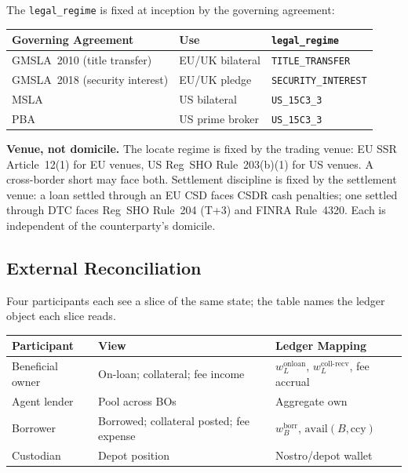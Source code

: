 The \texttt{legal\_regime} is fixed at inception by the governing agreement:

\begin{center}\small
\begin{tabular}{l l l}
\toprule
\textbf{Governing Agreement} & \textbf{Use} & \textbf{\texttt{legal\_regime}} \\
\midrule
GMSLA~2010 (title transfer) & EU/UK bilateral & \texttt{TITLE\_TRANSFER} \\
GMSLA~2018 (security interest) & EU/UK pledge & \texttt{SECURITY\_INTEREST} \\
MSLA & US bilateral & \texttt{US\_15C3\_3} \\
PBA & US prime broker & \texttt{US\_15C3\_3} \\
\bottomrule
\end{tabular}
\end{center}

\noindent\textbf{Venue, not domicile.} The locate regime is fixed by the trading venue: EU SSR Article~12(1) for EU venues, US Reg~SHO Rule~203(b)(1) for US venues. A cross-border short may face both. Settlement discipline is fixed by the settlement venue: a loan settled through an EU CSD faces CSDR cash penalties; one settled through DTC faces Reg~SHO Rule~204 (T+3) and FINRA Rule~4320. Each is independent of the counterparty's domicile.

\subsection{External Reconciliation}
\label{sec:sbl-external}

Four participants each see a slice of the same state; the table names the ledger object each slice reads.

\begin{center}
\small
\begin{tabular}{l p{4.5cm} p{3.5cm}}
\toprule
\textbf{Participant} & \textbf{View} & \textbf{Ledger Mapping} \\
\midrule
Beneficial owner & On-loan; collateral; fee income & $w^{\mathrm{onloan}}_L$, $w^{\mathrm{coll\text{-}recv}}_L$, fee accrual \\
Agent lender & Pool across BOs & Aggregate $\mathrm{own}$ \\
Borrower & Borrowed; collateral posted; fee expense & $w^{\mathrm{borr}}_B$, $\mathrm{avail}(B,\mathrm{ccy})$ \\
Custodian & Depot position & Nostro/depot wallet \\
\bottomrule
\end{tabular}
\end{center}

